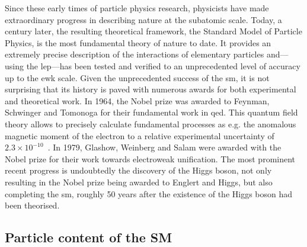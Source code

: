 Since these early times of particle physics research, physicists have made extraordinary progress in describing nature at the subatomic scale. Today, a century later, the resulting theoretical framework, the Standard Model of Particle Physics, is the most fundamental theory of nature to date. It provides an extremely precise description of the interactions of elementary particles and---using the \gls{lep}---has been tested and verified to an unprecedented level of accuracy up to the \gls{ewk} scale. Given the unprecedented success of the \gls{sm}, it is not surprising that its history is paved with numerous awards for both experimental and theoretical work. In 1964, the Nobel prize was awarded to Feynman, Schwinger and Tomonoga for their fundamental work in \gls{qed}. This quantum field theory allows to precisely calculate fundamental processes as e.g. the anomalous magnetic moment of the electron to a relative experimental uncertainty of $2.3 \times 10^{-10}$~\cite{Mohr:2015ccw}. In 1979, Glashow, Weinberg and Salam were awarded with the Nobel prize for their work towards electroweak unification. The most prominent recent progress is undoubtedly the discovery of the Higgs boson, not only resulting in the Nobel prize being awarded to Englert and Higgs, but also completing the \gls{sm}, roughly 50 years after the existence of the Higgs boson had been theorised. 

		
\subsection{Particle content of the SM}

